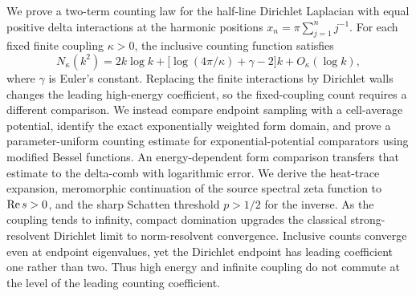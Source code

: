 We prove a two-term counting law for the half-line Dirichlet Laplacian
with equal positive delta interactions at the harmonic positions
$x_n=\pi\sum_{j=1}^n j^{-1}$.
For each fixed finite coupling $\kappa>0$, the inclusive counting
function satisfies
\[
N_\kappa(k^2)
=2k\log k+\bigl[\log(4\pi/\kappa)+\gamma-2\bigr]k
  +O_\kappa(\log k),
\]
where $\gamma$ is Euler's constant.
Replacing the finite interactions by Dirichlet walls changes the leading
high-energy coefficient, so the fixed-coupling count requires a different
comparison.
We instead compare endpoint sampling with a cell-average potential,
identify the exact exponentially weighted form domain, and prove a
parameter-uniform counting estimate for exponential-potential
comparators using modified Bessel functions.
An energy-dependent form comparison transfers that estimate to the
delta-comb with logarithmic error.
We derive the heat-trace expansion, meromorphic continuation of the
source spectral zeta function to $\operatorname{Re} s>0$, and the sharp Schatten
threshold $p>1/2$ for the inverse.
As the coupling tends to infinity, compact domination upgrades the
classical strong-resolvent Dirichlet limit to norm-resolvent convergence.
Inclusive counts converge even at endpoint eigenvalues, yet the
Dirichlet endpoint has leading coefficient one rather than two.
Thus high energy and infinite coupling do not commute at the level of
the leading counting coefficient.
